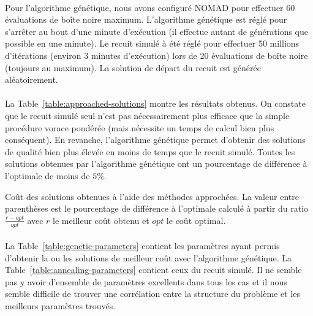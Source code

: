 \documentclass[12pt,letterpaper,twoside]{article}
\begin{document}
			\paragraph*{}
				Pour l'algorithme génétique, nous avons configuré NOMAD pour effectuer 60 évaluations de boîte noire maximum.
				L'algorithme génétique est réglé pour s'arrêter au bout d'une minute d'exécution (il effectue autant de générations
				que possible en une minute).
				Le recuit simulé à été réglé pour effectuer 50 millions d'itérations (environ 3 minutes d'exécution) lors de 20 évaluations de boîte noire (toujours au maximum). La solution de départ du recuit est générée aléatoirement.

			\paragraph*{}
				La Table~\ref{table:approached-solutions} montre les résultats obtenus.
				On constate que le recuit simulé seul n'est pas nécessairement plus efficace que la simple procédure vorace pondérée (mais nécessite un temps
				de calcul bien plus conséquent). En revanche, l'algorithme génétique permet d'obtenir des solutions de qualité bien plus élevée en moins de temps que
				le recuit simulé. Toutes les solutions obtenues par l'algorithme génétique ont un pourcentage de différence à l'optimale de moins de \(5\%\).

			\begin{table}[H]
				\centering
				
				\caption{Coût des solutions obtenues à l'aide des méthodes approchées. La valeur entre parenthèses est le pourcentage de différence à l'optimale calculé
					à partir du ratio \(\frac{r-opt}{opt}\) avec \(r\) le meilleur coût obtenu et \(opt\) le coût optimal.}
				\label{table:approached-solutions}
			\end{table}

			\paragraph*{}
				La Table~\ref{table:genetic-parameters} contient les paramètres ayant permis d'obtenir la ou les solutions de meilleur coût avec l'algorithme génétique.
				La Table~\ref{table:annealing-parameters} contient ceux du recuit simulé.
				Il ne semble pas y avoir d'ensemble de paramètres excellents dans tous les cas et il nous semble difficile
				de trouver une corrélation entre la structure du problème et les meilleurs paramètres trouvés.
\end{document}
